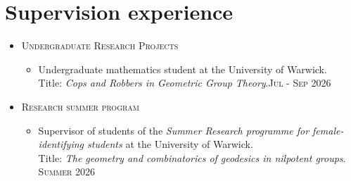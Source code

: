 \documentclass[a4paper,10pt]{article} %
\begin{document}
\section{Supervision experience}

%
%
%	

\begin{itemize}
	\item[] \textsc{Undergraduate Research Projects} \vspace{-1ex}
		\begin{itemize}
	  		\item[$\bullet$] Undergraduate mathematics student at the University of Warwick.
			\\ Title: \emph{Cops and Robbers in Geometric Group Theory}.\hfill \textsc{Jul} - \textsc{Sep} 2026
 		\end{itemize} \vspace{-0.5ex}

	\item[] \textsc{Research summer program} \vspace{-1ex}
		\begin{itemize}
			\item[$\bullet$] Supervisor of students of the \emph{Summer Research programme for female-identifying students} at the University of Warwick.			\\ Title: \emph{The geometry and combinatorics of geodesics in nilpotent groups}. \hfill \textsc{Summer} 2026 

		\end{itemize}
\end{itemize}
\end{document}
